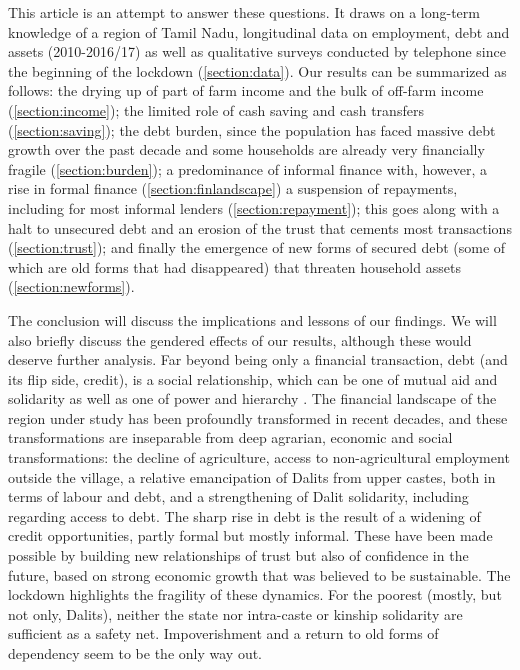 \documentclass[a4paper, 11pt, onecolumn]{article}
\begin{document}
This article is an attempt to answer these questions. 
It draws on a long-term knowledge of a region of Tamil Nadu, longitudinal data on employment, debt and assets (2010-2016/17) as well as qualitative surveys conducted by telephone since the beginning of the lockdown (\ref{section:data}). 
Our results can be summarized as follows: the drying up of part of farm income and the bulk of off-farm income (\ref{section:income}); the limited role of cash saving and cash transfers (\ref{section:saving}); the debt burden, since the population has faced massive debt growth over the past decade and some households are already very financially fragile (\ref{section:burden}); a predominance of informal finance with, however, a rise in formal finance (\ref{section:finlandscape}) a suspension of repayments, including for most informal lenders (\ref{section:repayment}); this goes along with a halt to unsecured debt and an erosion of the trust that cements most transactions (\ref{section:trust}); and finally the emergence of new forms of secured debt (some of which are old forms that had disappeared) that threaten household assets (\ref{section:newforms}).

The conclusion will discuss the implications and lessons of our findings. 
We will also briefly discuss the gendered effects of our results, although these would deserve further analysis. 
Far beyond being only a financial transaction, debt (and its flip side, credit), is a social relationship, which can be one of mutual aid and solidarity as well as one of power and hierarchy \citep{Mauss1993, Peebles2010}. 
The financial landscape of the region under study has been profoundly transformed in recent decades, and these transformations are inseparable from deep agrarian, economic and social transformations: the decline of agriculture, access to non-agricultural employment outside the village, a relative emancipation of Dalits from upper castes, both in terms of labour and debt, and a strengthening of Dalit solidarity, including regarding access to debt.
The sharp rise in debt is the result of a widening of credit opportunities, partly formal but mostly informal. 
These have been made possible by building new relationships of trust but also of confidence in the future, based on strong economic growth that was believed to be sustainable. 
The lockdown highlights the fragility of these dynamics. 
For the poorest (mostly, but not only, Dalits), neither the state nor intra-caste or kinship solidarity are sufficient as a safety net. 
Impoverishment and a return to old forms of dependency seem to be the only way out.
\end{document}
